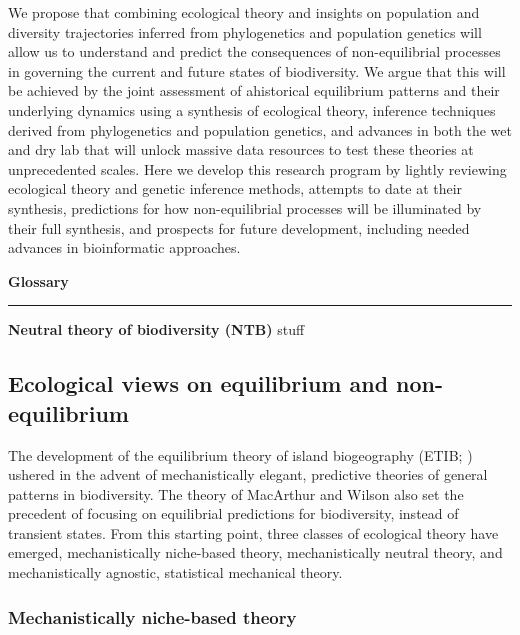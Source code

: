 \documentclass[12pt]{article}
\newcounter{Box}
\begin{document}
We propose that combining ecological theory and insights on population
and diversity trajectories inferred from phylogenetics and population
genetics will allow us to understand and predict the consequences of
non-equilibrial processes in governing the current and future states
of biodiversity. We argue that this will be achieved by the joint
assessment of ahistorical equilibrium patterns and their underlying
dynamics using a synthesis of ecological theory, inference techniques
derived from phylogenetics and population genetics, and advances in
both the wet and dry lab that will unlock massive data resources to
test these theories at unprecedented scales. Here we develop this
research program by lightly reviewing ecological theory and genetic
inference methods, attempts to date at their synthesis, predictions
for how non-equilibrial processes will be illuminated by their full
synthesis, and prospects for future development, including needed
advances in bioinformatic approaches.

\noindent
\colorbox{gray!20}{
  \begin{minipage}{0.97\textwidth}
    \label{box:lab}
    \noindent
    {\bf \large Glossary} 
    \vspace{1pt}
    \hrule
    \vspace{1pt}
    
    {\bf Neutral theory of biodiversity (NTB)} stuff
  \end{minipage}
}

\subsection{Ecological views on equilibrium and non-equilibrium}

The development of the equilibrium theory of island biogeography
(ETIB; \cite{MacArthur1967-ux}) ushered in the advent of
mechanistically elegant, predictive theories of general patterns in
biodiversity. The theory of MacArthur and Wilson also set the
precedent of focusing on equilibrial predictions for biodiversity,
instead of transient states. From this starting point, three classes
of ecological theory have emerged, mechanistically niche-based theory,
mechanistically neutral theory, and mechanistically agnostic,
statistical mechanical theory.

\subsubsection{Mechanistically niche-based theory}
\end{document}
